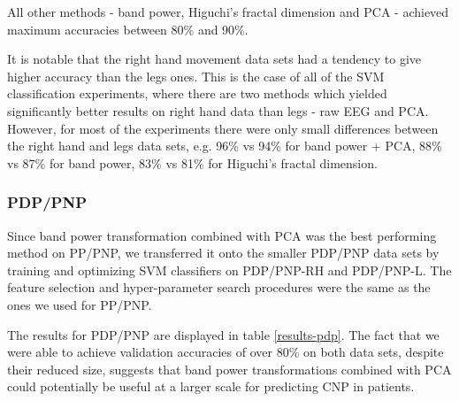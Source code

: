 \documentclass{mpaper}
\begin{document}
All other methods - band power, Higuchi's fractal dimension and PCA - achieved maximum accuracies between 80\% and 90\%.

It is notable that the right hand movement data sets had a tendency to give higher accuracy than the legs ones. This is the case of all of the SVM classification experiments, where there are two methods which yielded significantly better results on right hand data than legs - raw EEG and PCA. However, for most of the experiments there were only small differences between the right hand and legs data sets, e.g. 96\% vs 94\% for band power + PCA, 88\% vs 87\% for band power, 83\% vs 81\% for Higuchi's fractal dimension.

\subsubsection{PDP/PNP}

Since band power transformation combined with PCA was the best performing method on PP/PNP, we transferred it onto the smaller PDP/PNP data sets by training and optimizing SVM classifiers on PDP/PNP-RH and PDP/PNP-L. The feature selection and hyper-parameter search procedures were the same as the ones we used for PP/PNP.

The results for PDP/PNP are displayed in table \ref{results-pdp}. The fact that we were able to achieve validation accuracies of over 80\% on both data sets, despite their reduced size, suggests that band power transformations combined with PCA could potentially be useful at a larger scale for predicting CNP in patients.
\end{document}
